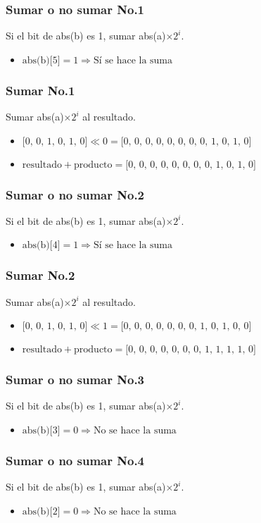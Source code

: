 \documentclass{beamer}
\begin{document}
\begin{frame}
\frametitle{Sumar o no sumar No.1}
Si el bit de abs(b) es 1, sumar abs(a)$\times 2^{i}$.
\begin{itemize}
\item $\text{abs(b)[5]} = \text{1} \Longrightarrow \text{Sí se hace la suma}$
\end{itemize}
\end{frame}
\begin{frame}
\frametitle{Sumar No.1}
Sumar abs(a)$\times 2^{i}$ al resultado.
\begin{itemize}
\item $\text{[0, 0, 1, 0, 1, 0]} \ll \text{0} = \text{[0, 0, 0, 0, 0, 0, 0, 0, 1, 0, 1, 0]}$
\item $\text{resultado} + \text{producto} = \text{[0, 0, 0, 0, 0, 0, 0, 0, 1, 0, 1, 0]}$
\end{itemize}
\end{frame}
\begin{frame}
\frametitle{Sumar o no sumar No.2}
Si el bit de abs(b) es 1, sumar abs(a)$\times 2^{i}$.
\begin{itemize}
\item $\text{abs(b)[4]} = \text{1} \Longrightarrow \text{Sí se hace la suma}$
\end{itemize}
\end{frame}
\begin{frame}
\frametitle{Sumar No.2}
Sumar abs(a)$\times 2^{i}$ al resultado.
\begin{itemize}
\item $\text{[0, 0, 1, 0, 1, 0]} \ll \text{1} = \text{[0, 0, 0, 0, 0, 0, 0, 1, 0, 1, 0, 0]}$
\item $\text{resultado} + \text{producto} = \text{[0, 0, 0, 0, 0, 0, 0, 1, 1, 1, 1, 0]}$
\end{itemize}
\end{frame}
\begin{frame}
\frametitle{Sumar o no sumar No.3}
Si el bit de abs(b) es 1, sumar abs(a)$\times 2^{i}$.
\begin{itemize}
\item $\text{abs(b)[3]} = \text{0} \Longrightarrow \text{No se hace la suma}$
\end{itemize}
\end{frame}
\begin{frame}
\frametitle{Sumar o no sumar No.4}
Si el bit de abs(b) es 1, sumar abs(a)$\times 2^{i}$.
\begin{itemize}
\item $\text{abs(b)[2]} = \text{0} \Longrightarrow \text{No se hace la suma}$
\end{itemize}
\end{frame}
\end{document}

